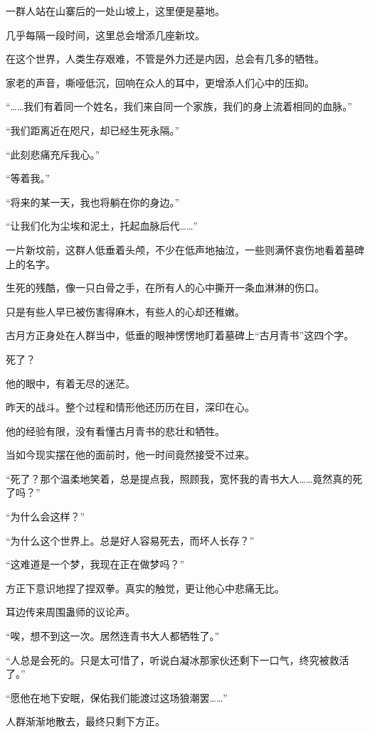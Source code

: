 \begin{this_body}
一群人站在山寨后的一处山坡上，这里便是墓地。

几乎每隔一段时间，这里总会增添几座新坟。

在这个世界，人类生存艰难，不管是外力还是内因，总会有几多的牺牲。

家老的声音，嘶哑低沉，回响在众人的耳中，更增添人们心中的压抑。

“……我们有着同一个姓名，我们来自同一个家族，我们的身上流着相同的血脉。”

“我们距离近在咫尺，却已经生死永隔。”

“此刻悲痛充斥我心。”

“等着我。”

“将来的某一天，我也将躺在你的身边。”

“让我们化为尘埃和泥土，托起血脉后代……”

一片新坟前，这群人低垂着头颅，不少在低声地抽泣，一些则满怀哀伤地看着墓碑上的名字。

生死的残酷，像一只白骨之手，在所有人的心中撕开一条血淋淋的伤口。

只是有些人早已被伤害得麻木，有些人的心却还稚嫩。

古月方正身处在人群当中，低垂的眼神愣愣地盯着墓碑上“古月青书”这四个字。

死了？

他的眼中，有着无尽的迷茫。

昨天的战斗。整个过程和情形他还历历在目，深印在心。

他的经验有限，没有看懂古月青书的悲壮和牺牲。

当如今现实摆在他的面前时，他一时间竟然接受不过来。

“死了？那个温柔地笑着，总是提点我，照顾我，宽怀我的青书大人……竟然真的死了吗？”

“为什么会这样？”

“为什么这个世界上。总是好人容易死去，而坏人长存？”

“这难道是一个梦，我现在正在做梦吗？”

方正下意识地捏了捏双拳。真实的触觉，更让他心中悲痛无比。

耳边传来周围蛊师的议论声。

“唉，想不到这一次。居然连青书大人都牺牲了。”

“人总是会死的。只是太可惜了，听说白凝冰那家伙还剩下一口气，终究被救活了。”

“愿他在地下安眠，保佑我们能渡过这场狼潮罢……”

人群渐渐地散去，最终只剩下方正。


\end{this_body}
